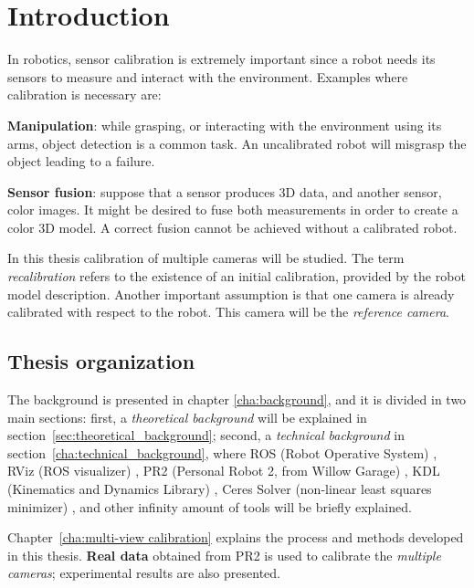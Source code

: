 \chapter{Introduction}
\label{cha:intro}

\vspace*{-2ex}
In robotics, sensor calibration is extremely important since a robot needs its sensors to measure and interact with the environment.
Examples where calibration is necessary are:
\begin{itemize*}
 \item \textbf{Manipulation}: while grasping, or interacting with the environment using its arms, object detection is a common task. An uncalibrated robot will misgrasp the object leading to a failure.

 \item \textbf{Sensor fusion}: suppose that a sensor produces 3D data, and another sensor, color images. It might be desired to fuse both measurements in order to create a color 3D model. A correct fusion cannot be achieved without a calibrated robot.
\end{itemize*}

\noindent
In this thesis calibration of multiple cameras will be studied. The term \textit{recalibration} refers to the existence of an initial calibration, provided by the robot model description. Another important assumption is that one camera is already calibrated with respect to the robot. This camera will be the \textit{reference camera}.


\vspace*{-2ex}
\section{Thesis organization} %

The background is presented in chapter \ref{cha:background}, and it is divided in two main sections: first, a \textit{theoretical background} will be explained in section~\ref{sec:theoretical_background}; second, a \textit{technical background} in section~\ref{cha:technical_background}, where ROS (Robot Operative System) \cite{ROS}, RViz (ROS visualizer) \cite{RViz}, PR2 (Personal Robot 2, from Willow Garage) \cite{PR2}, KDL (Kinematics and Dynamics Library) \cite{KDL}, Ceres Solver (non-linear least squares minimizer) \cite{ceres}, and other infinity amount of tools will be briefly explained.

Chapter~\ref{cha:multi-view calibration} explains the process and methods developed in this thesis. \textbf{Real data} obtained from PR2 is used to calibrate the \textit{multiple cameras}; experimental results are also presented.

